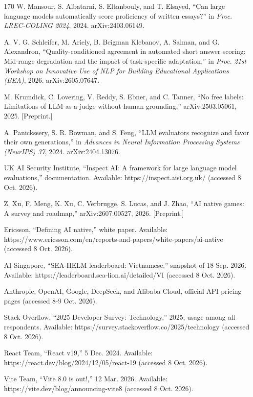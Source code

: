 \begin{thebibliography}{170}
 W. Mansour, S. Albatarni, S. Eltanbouly, and T. Elsayed, ``Can large language models automatically score proficiency of written essays?'' in \textit{Proc. LREC-COLING 2024}, 2024. arXiv:2403.06149.

 A. V. G. Schleifer, M. Ariely, B. Beigman Klebanov, A. Salman, and G. Alexandron, ``Quality-conditioned agreement in automated short answer scoring: Mid-range degradation and the impact of task-specific adaptation,'' in \textit{Proc. 21st Workshop on Innovative Use of NLP for Building Educational Applications (BEA)}, 2026. arXiv:2605.07647.

 M. Krumdick, C. Lovering, V. Reddy, S. Ebner, and C. Tanner, ``No free labels: Limitations of LLM-as-a-judge without human grounding,'' arXiv:2503.05061, 2025. [Preprint.]

 A. Panickssery, S. R. Bowman, and S. Feng, ``LLM evaluators recognize and favor their own generations,'' in \textit{Advances in Neural Information Processing Systems (NeurIPS) 37}, 2024. arXiv:2404.13076.

 UK AI Security Institute, ``Inspect AI: A framework for large language model evaluations,'' documentation. Available: https://inspect.aisi.org.uk/ (accessed 8 Oct. 2026).

 Z. Xu, F. Meng, K. Xu, C. Verbrugge, S. Lucas, and J. Zhao, ``AI native games: A survey and roadmap,'' arXiv:2607.00527, 2026. [Preprint.]

 Ericsson, ``Defining AI native,'' white paper. Available: https://www.ericsson.com/en/reports-and-papers/white-papers/ai-native (accessed 8 Oct. 2026).

 AI Singapore, ``SEA-HELM leaderboard: Vietnamese,'' snapshot of 18 Sep. 2026. Available: https://leaderboard.sea-lion.ai/detailed/VI (accessed 8 Oct. 2026).

 Anthropic, OpenAI, Google, DeepSeek, and Alibaba Cloud, official API pricing pages (accessed 8-9 Oct. 2026).

 Stack Overflow, ``2025 Developer Survey: Technology,'' 2025; usage among all respondents. Available: https://survey.stackoverflow.co/2025/technology (accessed 8 Oct. 2026).

 React Team, ``React v19,'' 5 Dec. 2024. Available: https://react.dev/blog/2024/12/05/react-19 (accessed 8 Oct. 2026).

 Vite Team, ``Vite 8.0 is out!,'' 12 Mar. 2026. Available: https://vite.dev/blog/announcing-vite8 (accessed 8 Oct. 2026).


\end{thebibliography}
